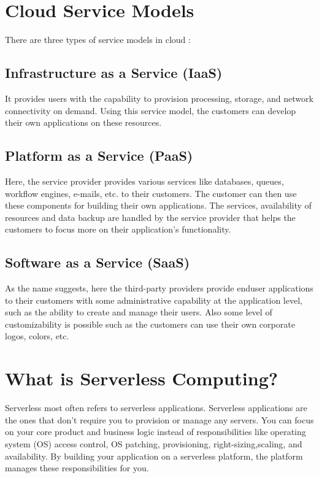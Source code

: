 \section{Cloud Service Models}

There are three types of service models in cloud : 

\subsection{Infrastructure as a Service (IaaS)}
It provides users with the capability to provision processing,
storage, and network connectivity on demand. Using this service model, the customers can develop their own
applications on these resources.

\subsection{Platform as a Service (PaaS)}
Here, the service provider provides various services like databases,
queues, workflow engines, e-mails, etc. to their customers. The customer can then use these components for
building their own applications. The services, availability of resources and data backup are handled by the
service provider that helps the customers to focus more on their application's functionality.

\subsection{Software as a Service (SaaS)}
As the name suggests, here the third-party providers provide enduser applications to their customers with some administrative capability at the application level, such as the
ability to create and manage their users. Also some level of customizability is possible such as the customers
can use their own corporate logos, colors, etc.

\section{What is Serverless Computing?}

Serverless most often refers to serverless applications. Serverless applications are the ones that don't require
you to provision or manage any servers. You can focus on your core product and business logic instead of
responsibilities like operating system (OS) access control, OS patching, provisioning, right-sizing,scaling,
and availability. By building your application on a serverless platform, the platform manages these
responsibilities for you.

